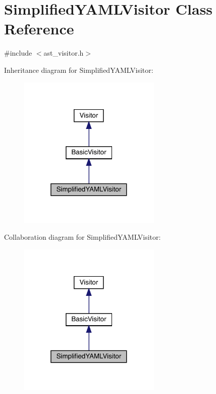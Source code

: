 \hypertarget{class_simplified_y_a_m_l_visitor}{}\section{Simplified\+Y\+A\+M\+L\+Visitor Class Reference}
\label{class_simplified_y_a_m_l_visitor}


{\ttfamily \#include $<$ast\+\_\+visitor.\+h$>$}



Inheritance diagram for Simplified\+Y\+A\+M\+L\+Visitor\+:
\nopagebreak
\begin{figure}[H]
\begin{center}
\leavevmode
\includegraphics[width=193pt]{class_simplified_y_a_m_l_visitor__inherit__graph}
\end{center}
\end{figure}


Collaboration diagram for Simplified\+Y\+A\+M\+L\+Visitor\+:
\nopagebreak
\begin{figure}[H]
\begin{center}
\leavevmode
\includegraphics[width=193pt]{class_simplified_y_a_m_l_visitor__coll__graph}
\end{center}
\end{figure}

